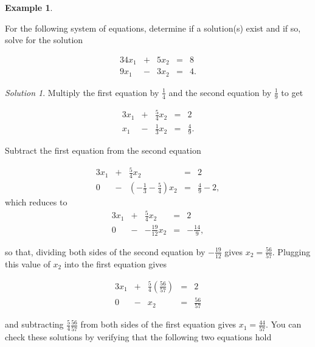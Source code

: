 \documentclass[
]{book}
\theoremstyle{definition}
\theoremstyle{definition}
\newtheorem{example}{Example}[chapter]
\theoremstyle{definition}
\theoremstyle{remark}
\newtheorem*{solution}{Solution}
\begin{document}
\begin{example}
\protect\hypertarget{exm:unlabeled-div-50}{}\label{exm:unlabeled-div-50}

For the following system of equations, determine if a solution(s) exist and if so, solve for the solution

\begin{alignat*}{3}
4 x_1 & {}+{} & 5 x_2 & {}={} & 8 \\
9 x_1 & {}-{} & 3 x_2 & {}={} & 4.
\end{alignat*}

\end{example}

\begin{solution}

Multiply the first equation by \(\frac{1}{4}\) and the second equation by \(\frac{1}{9}\) to get

\begin{alignat*}{3}
x_1 & {}+{} & \frac{5}{4} x_2 & {}={} & 2 \\
x_1 & {}-{} &  \frac{1}{3}x_2 & {}={} & \frac{4}{9}.
\end{alignat*}

Subtract the first equation from the second equation

\begin{alignat*}{3}
x_1 & {}+{} & \frac{5}{4} x_2 & {}={} & 2 \\
0 & {}-{} &  (-\frac{1}{3} - \frac{5}{4}) x_2 & {}={} & \frac{4}{9} - 2,
\end{alignat*}
which reduces to
\begin{alignat*}{3}
x_1 & {}+{} & \frac{5}{4} x_2 & {}={} & 2 \\
0 & {}-{} &  -\frac{19}{12} x_2 & {}={} & -\frac{14}{9},
\end{alignat*}

so that, dividing both sides of the second equation by \(-\frac{19}{12}\) gives \(x_2 = \frac{56}{57}\). Plugging this value of \(x_2\) into the first equation gives

\begin{alignat*}{3}
x_1 & {}+{} & \frac{5}{4} \left(\frac{56}{57}\right) & {}={} & 2 \\
0 & {}-{} &   x_2 & {}={} & \frac{56}{57}
\end{alignat*}

and subtracting \(\frac{5}{4} \frac{56}{57}\) from both sides of the first equation gives \(x_1 = \frac{44}{57}\). You can check these solutions by verifying that the following two equations hold


\end{solution}
\end{document}
